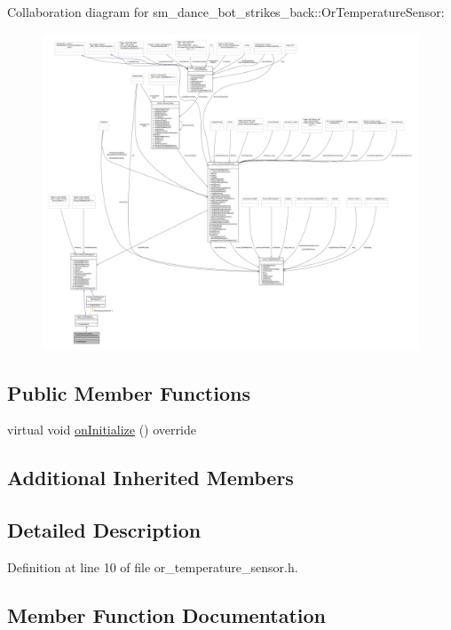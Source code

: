 Collaboration diagram for sm\+\_\+dance\+\_\+bot\+\_\+strikes\+\_\+back\+:\+:Or\+Temperature\+Sensor\+:
\nopagebreak
\begin{figure}[H]
\begin{center}
\leavevmode
\includegraphics[width=350pt]{classsm__dance__bot__strikes__back_1_1OrTemperatureSensor__coll__graph}
\end{center}
\end{figure}
\subsection*{Public Member Functions}
\begin{DoxyCompactItemize}
\item 
virtual void \hyperlink{classsm__dance__bot__strikes__back_1_1OrTemperatureSensor_a5ad96122dd84bf27e0a1f5c7c87be7e2}{on\+Initialize} () override
\end{DoxyCompactItemize}
\subsection*{Additional Inherited Members}


\subsection{Detailed Description}


Definition at line 10 of file or\+\_\+temperature\+\_\+sensor.\+h.



\subsection{Member Function Documentation}
